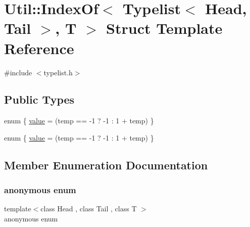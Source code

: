 \hypertarget{structUtil_1_1TL_1_1IndexOf_3_01Typelist_3_01Head_00_01Tail_01_4_00_01T_01_4}{}\section{Util\+:\+:Index\+Of$<$ Typelist$<$ Head, Tail $>$, T $>$ Struct Template Reference}
\label{structUtil_1_1TL_1_1IndexOf_3_01Typelist_3_01Head_00_01Tail_01_4_00_01T_01_4}


{\ttfamily \#include $<$typelist.\+h$>$}

\subsection*{Public Types}
\begin{DoxyCompactItemize}
\item 
enum \{ \mbox{\hyperlink{structUtil_1_1TL_1_1IndexOf_3_01Typelist_3_01Head_00_01Tail_01_4_00_01T_01_4_adb54f5ccfd004deb6c49f36f07ab8dd9a1e7a87771ff8eabd5b26f13ca2c1852b}{value}} = (temp == -\/1 ? -\/1 \+: 1 + temp)
 \}
\item 
enum \{ \mbox{\hyperlink{structUtil_1_1TL_1_1IndexOf_3_01Typelist_3_01Head_00_01Tail_01_4_00_01T_01_4_adb54f5ccfd004deb6c49f36f07ab8dd9a1e7a87771ff8eabd5b26f13ca2c1852b}{value}} = (temp == -\/1 ? -\/1 \+: 1 + temp)
 \}
\end{DoxyCompactItemize}


\subsection{Member Enumeration Documentation}
\mbox{\label{structUtil_1_1TL_1_1IndexOf_3_01Typelist_3_01Head_00_01Tail_01_4_00_01T_01_4_adb54f5ccfd004deb6c49f36f07ab8dd9}} 
\subsubsection{\texorpdfstring{anonymous enum}{anonymous enum}}
{\footnotesize\ttfamily template$<$class Head , class Tail , class T $>$ \\
anonymous enum}

